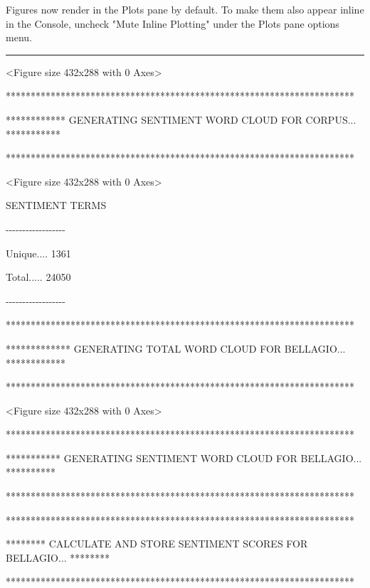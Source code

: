 Figures now render in the Plots pane by default. To make them also
appear inline in the Console, uncheck "Mute Inline Plotting" under the
Plots pane options menu.

\begin{center}\rule{0.5\linewidth}{0.5pt}\end{center}

\hfill\break
\textless Figure size 432x288 with 0 Axes\textgreater{}

\hfill\break

**********************************************************************

************ GENERATING SENTIMENT WORD CLOUD FOR CORPUS... ***********

**********************************************************************

\textless Figure size 432x288 with 0 Axes\textgreater{}

\hfill\break

SENTIMENT TERMS

-\/-\/-\/-\/-\/-\/-\/-\/-\/-\/-\/-\/-\/-\/-\/-\/-\/-

Unique.... 1361

Total..... 24050

-\/-\/-\/-\/-\/-\/-\/-\/-\/-\/-\/-\/-\/-\/-\/-\/-\/-

\hfill\break

**********************************************************************

************* GENERATING TOTAL WORD CLOUD FOR BELLAGIO... ************

**********************************************************************

\textless Figure size 432x288 with 0 Axes\textgreater{}

\hfill\break

**********************************************************************

*********** GENERATING SENTIMENT WORD CLOUD FOR BELLAGIO... **********

**********************************************************************

\hfill\break

**********************************************************************

******** CALCULATE AND STORE SENTIMENT SCORES FOR BELLAGIO... ********

**********************************************************************

